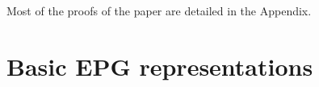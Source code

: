 \documentclass[9pt]{entcs}
\newtheorem{lema}{Lemma}[section]
\newtheorem{coro}{Corollary}[section]
\newtheorem{prove}{Proof}[section]
\begin{document}
Most of the proofs of the paper are detailed in the Appendix.
 
\section{Basic EPG representations}




\end{document}
